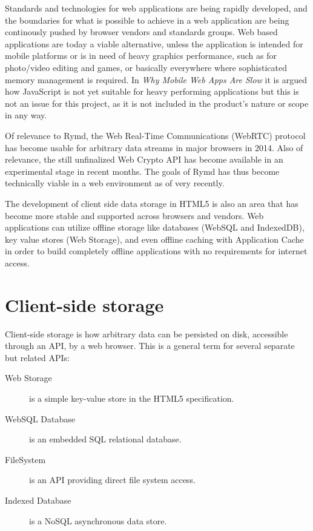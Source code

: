 Standards and technologies for web applications are being rapidly developed, and the boundaries for what is possible to achieve in a web application are being continously pushed by browser vendors and standards groups. Web based applications are today a viable alternative, unless the application is intended for mobile platforms or is in need of heavy graphics performance, such as for photo/video editing and games, or basically everywhere where sophisticated memory management is required. In \emph{Why Mobile Web Apps Are Slow} \cite{MobileApps:Online} it is argued how JavaScript is not yet suitable for heavy performing applications but this is not an issue for this project, as it is not included in the product's nature or scope in any way.

Of relevance to Rymd, the Web Real-Time Communications (WebRTC) protocol \cite{WebRTC:Online} has become usable for arbitrary data streams in major browsers in 2014. Also of relevance, the still unfinalized Web Crypto API \cite{WebCrypto:Online} has become available in an experimental stage in recent months. The goals of Rymd has thus become technically viable in a web environment as of very recently.

The development of client side data storage in HTML5 is also an area that has become more stable and supported across browsers and vendors. Web applications can utilize offline storage like databases (WebSQL and IndexedDB), key value stores (Web Storage), and even offline caching with Application Cache \cite{OfflineWebApps:Online} in order to build completely offline applications with no requirements for internet access.

\section{Client-side storage}

Client-side storage is how arbitrary data can be persisted on disk, accessible through an API, by a web browser. This is a general term for several separate but related APIs:

\begin{description}
  \item[Web Storage]\cite{WebStorage:Online} is a simple key-value store in the HTML5 specification.
  \item[WebSQL Database]\cite{WebSQL:Online} is an embedded SQL relational database.
  \item[FileSystem]\cite{FileSystem:Online} is an API providing direct file system access.
  \item[Indexed Database]\cite{IndexedDB:Online} is a NoSQL asynchronous data store.
\end{description}

